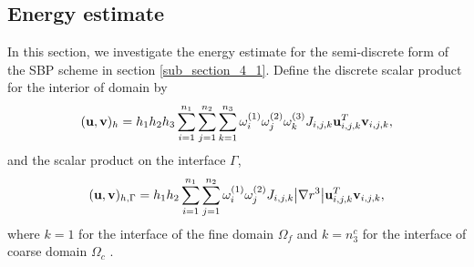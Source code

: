 \documentclass[a4paper]{article}
\begin{document}
\subsection{Energy estimate}


In this section, we investigate the energy estimate for the semi-discrete form of the SBP scheme in section \ref{sub_section_4_1}. Define the discrete scalar product for the interior of domain by
\begin{equation}\label{scalar_product_discrete_interior}
({\bf u}, {\bf v})_h = h_1h_2h_3\sum_{i=1}^{n_1}\sum_{j=1}^{n_2}\sum_{k=1}^{n_3}\omega_i^{(1)}\omega_j^{(2)}\omega_k^{(3)}J_{i,j,k}{\bf u}^{T}_{i,j,k}{\bf v}_{i,j,k},
\end{equation}
and the scalar product on the interface $\Gamma$,
\begin{equation}\label{scalar_product_discrete_interface}
({\bf u}, {\bf v})_{h,\Gamma} = h_1h_2\sum_{i=1}^{n_1}\sum_{j=1}^{n_2}\omega_i^{(1)}\omega_j^{(2)}J_{i,j,k}\big|\nabla r^{3}\big|{\bf u}_{i,j,k}^{T}{\bf v}_{i,j,k},
\end{equation}
where $k = 1$ for the interface of the fine domain $\Omega_f$ and $k = n_3^c$ for the interface of coarse domain $\Omega_c$ .
\end{document}
